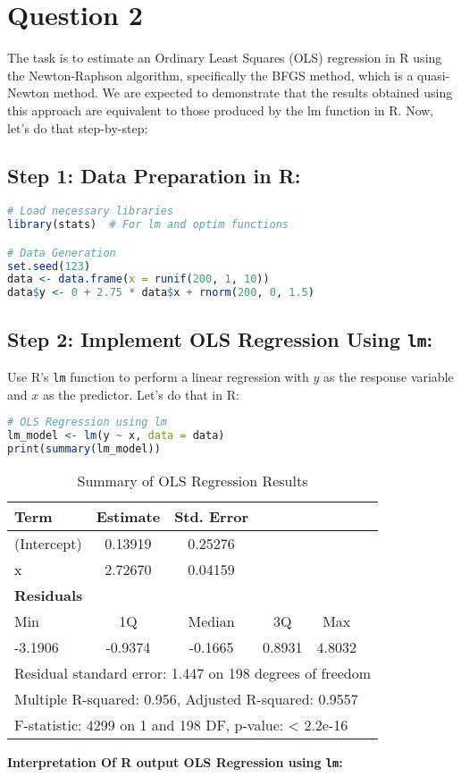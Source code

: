 \documentclass[12pt,letterpaper]{article}
\begin{document}
\section*{Question 2}

The task is to estimate an Ordinary Least Squares (OLS) regression in R using the Newton-Raphson algorithm, specifically the BFGS method, which is a quasi-Newton method. We are expected to demonstrate that the results obtained using this approach are equivalent to those produced by the lm function in R. Now, let’s do that step-by-step:

\subsection*{Step 1: Data Preparation in R:}

\begin{lstlisting}[language=R]
# Load necessary libraries
library(stats)  # For lm and optim functions

# Data Generation
set.seed(123)
data <- data.frame(x = runif(200, 1, 10))
data$y <- 0 + 2.75 * data$x + rnorm(200, 0, 1.5)
\end{lstlisting}
\subsection*{Step 2: Implement OLS Regression Using \texttt{lm}:}
 Use R's \texttt{lm} function to perform a linear regression with \( y \) as the response variable and \( x \) as the predictor.
Let’s do that in R: 
\begin{lstlisting}[language=R]
# OLS Regression using lm
lm_model <- lm(y ~ x, data = data)
print(summary(lm_model))
\end{lstlisting}
\begin{table}[ht]
\centering
\begin{tabular}{lccccc}
\hline
\textbf{Term} & \textbf{Estimate} & \textbf{Std. Error} & & & \\
\hline
(Intercept) & 0.13919 & 0.25276 & & & \\
x & 2.72670 & 0.04159 & & & \\
\hline
\multicolumn{6}{l}{\textbf{Residuals}} \\
\hline
Min & 1Q & Median & 3Q & Max & \\
-3.1906 & -0.9374 & -0.1665 & 0.8931 & 4.8032 & \\
\hline
\multicolumn{6}{l}{Residual standard error: 1.447 on 198 degrees of freedom} \\
\multicolumn{6}{l}{Multiple R-squared: 0.956, Adjusted R-squared: 0.9557} \\
\multicolumn{6}{l}{F-statistic: 4299 on 1 and 198 DF, p-value: < 2.2e-16} \\
\hline
\end{tabular}
\caption{Summary of OLS Regression Results}
\label{tab:ols_results}
\end{table}
\FloatBarrier %
\textbf{Interpretation Of R output OLS Regression using \texttt{lm}:}
\end{document}
